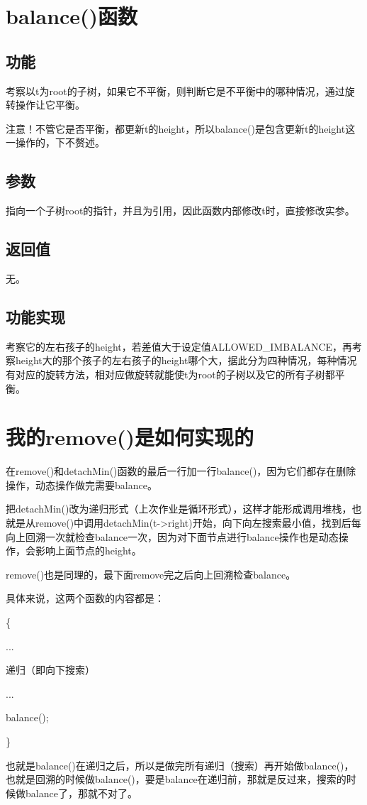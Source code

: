 \documentclass[UTF8]{ctexart}
\begin{document}
\pagestyle{fancy}
\fancyhead{}

\section{balance()函数}
\subsection{功能}
考察以t为root的子树，如果它不平衡，则判断它是不平衡中的哪种情况，通过旋转操作让它平衡。

注意！不管它是否平衡，都更新t的height，所以balance()是包含更新t的height这一操作的，下不赘述。
\subsection{参数}
指向一个子树root的指针，并且为引用，因此函数内部修改t时，直接修改实参。
\subsection{返回值}
无。
\subsection{功能实现}
考察它的左右孩子的height，若差值大于设定值ALLOWED\_IMBALANCE，再考察height大的那个孩子的左右孩子的height哪个大，据此分为四种情况，每种情况有对应的旋转方法，相对应做旋转就能使t为root的子树以及它的所有子树都平衡。

\section{我的remove()是如何实现的}
在remove()和detachMin()函数的最后一行加一行balance()，因为它们都存在删除操作，动态操作做完需要balance。

把detachMin()改为递归形式（上次作业是循环形式），这样才能形成调用堆栈，也就是从remove()中调用detachMin(t->right)开始，向下向左搜索最小值，找到后每向上回溯一次就检查balance一次，因为对下面节点进行balance操作也是动态操作，会影响上面节点的height。

remove()也是同理的，最下面remove完之后向上回溯检查balance。

具体来说，这两个函数的内容都是：

\{

        ...

        递归（即向下搜索）

        ...

        balance();

\}

也就是balance()在递归之后，所以是做完所有递归（搜索）再开始做balance()，也就是回溯的时候做balance()，要是balance在递归前，那就是反过来，搜索的时候做balance了，那就不对了。
\end{document}
